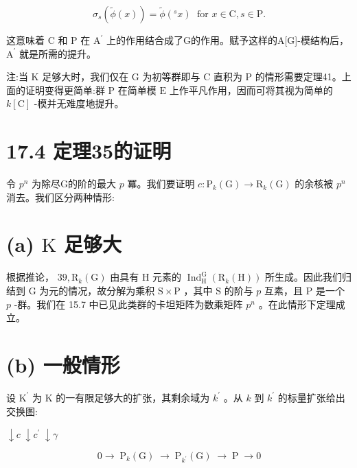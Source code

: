 \documentclass[10pt]{article}
\begin{document}
\[
{\sigma }_{s}\left( {\widetilde{\phi }\left( x\right) }\right)  = \widetilde{\phi }\left( {{}^{s}x}\right) \;\text{ for }x \in  \mathrm{C},s \in  \mathrm{P}.
\]

这意味着 \(\mathrm{C}\) 和 \(\mathrm{P}\) 在 \({\mathrm{A}}^{\prime }\) 上的作用结合成了G的作用。赋予这样的A[G]-模结构后， \({\mathrm{A}}^{\prime }\) 就是所需的提升。

注:当 \(\mathrm{K}\) 足够大时，我们仅在 \(\mathrm{G}\) 为初等群即与 \(\mathrm{C}\) 直积为 \(\mathrm{P}\) 的情形需要定理41。上面的证明变得更简单:群 \(\mathrm{P}\) 在简单模 \(\mathrm{E}\) 上作平凡作用，因而可将其视为简单的 \(k\left\lbrack  \mathrm{C}\right\rbrack\) -模并无难度地提升。

\section*{17.4 定理35的证明}

令 \({p}^{n}\) 为除尽G的阶的最大 \(p\) 冪。我们要证明 \(c : {\mathrm{P}}_{k}\left( \mathrm{G}\right)  \rightarrow  {\mathrm{R}}_{k}\left( \mathrm{G}\right)\) 的余核被 \({p}^{n}\) 消去。我们区分两种情形:

\section*{(a) \(\mathrm{K}\) 足够大}

根据推论， \({39},{\mathrm{R}}_{k}\left( \mathrm{G}\right)\) 由具有 \(\mathrm{H}\) 元素的 \({\operatorname{Ind}}_{\mathrm{H}}^{\mathrm{G}}\left( {{\mathrm{R}}_{k}\left( \mathrm{H}\right) }\right)\) 所生成。因此我们归结到 \(\mathrm{G}\) 为元的情况，故分解为乘积 \(\mathrm{S} \times  \mathrm{P}\) ，其中 \(\mathrm{S}\) 的阶与 \(p\) 互素，且 \(\mathrm{P}\) 是一个 \(p\) -群。我们在 15.7 中已见此类群的卡坦矩阵为数乘矩阵 \({p}^{n}\) 。在此情形下定理成立。

\section*{(b) 一般情形}

设 \({\mathrm{K}}^{\prime }\) 为 \(\mathrm{K}\) 的一有限足够大的扩张，其剩余域为 \({k}^{\prime }\) 。从 \(k\) 到 \({k}^{\prime }\) 的标量扩张给出交换图:

\(\downarrow  c\; \downarrow  {c}^{\prime }\; \downarrow  \gamma\)

\[
0 \rightarrow  \;{\mathrm{P}}_{k}\left( \mathrm{G}\right) \; \rightarrow  \;{\mathrm{P}}_{{k}^{\prime }}\left( \mathrm{G}\right) \; \rightarrow  \;\mathrm{P}\; \rightarrow  0
\]
\end{document}
